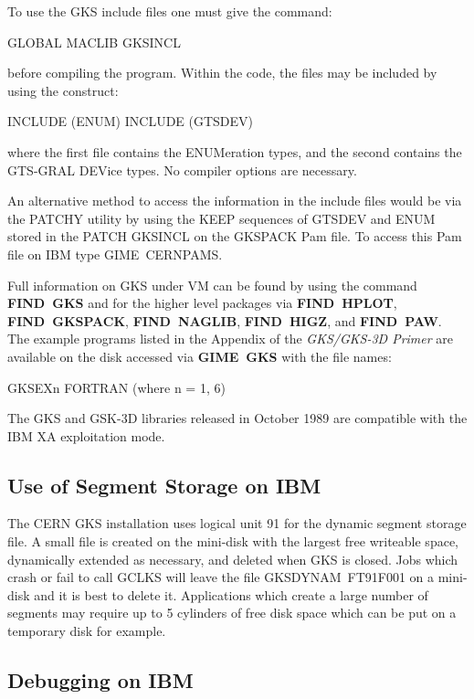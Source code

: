 To use the GKS include files one must give the command:
\begin{XMP}
GLOBAL MACLIB GKSINCL
\end{XMP}
before compiling the program. Within the code, the files may be included
by using the construct:
\begin{XMP}
INCLUDE (ENUM)
INCLUDE (GTSDEV)
\end{XMP}
where the first file contains the ENUMeration types, and the second
contains the GTS-GRAL DEVice types. No compiler options are necessary.
 
An alternative method to access the information in the include files
would be via the PATCHY utility by using the KEEP sequences of
GTSDEV and ENUM stored in the PATCH GKSINCL on the GKSPACK Pam file.
To access this Pam file on IBM type GIME~CERNPAMS.
 
Full information on GKS under VM can be found by using the command
{\bf FIND~GKS} and for the higher level packages via
{\bf FIND~HPLOT}, {\bf FIND~GKSPACK},
{\bf FIND~NAGLIB}, {\bf FIND~HIGZ},
and {\bf FIND~PAW}.
The example programs listed in the Appendix of the
{\it GKS/GKS-3D Primer} are available on the disk accessed via
{\bf GIME~GKS} with the file names:
\begin{XMP}
GKSEXn FORTRAN  (where n = 1, 6)
\end{XMP}
 
The GKS and GSK-3D libraries released in October 1989 are compatible with
the IBM XA exploitation mode.
\subsection{Use of Segment Storage on IBM}
 
The CERN GKS installation uses logical unit 91 for the dynamic segment
storage file.
A small file is created on the mini-disk with the largest free writeable
space, dynamically extended as necessary, and deleted when GKS is closed.
Jobs which crash or fail to call GCLKS will leave the file
GKSDYNAM~FT91F001 on a mini-disk and it is best to delete it.
Applications which create a large number of segments may require
up to 5 cylinders of free disk space which can be put on a temporary
disk for example.
\subsection{Debugging on IBM}
 
